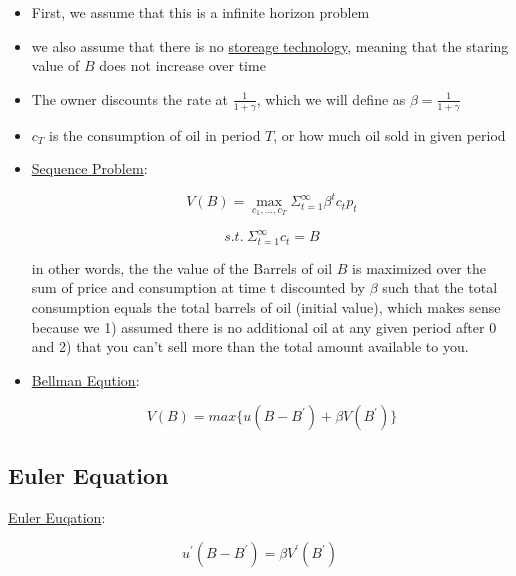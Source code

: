 \documentclass{article}
\begin{document}
\begin{itemize}

\item First, we assume that this is a infinite horizon problem

\item we also assume that there is no \underline{storeage technology}, meaning that the staring value of $B$ does not increase over time

\item The owner discounts the rate at $\frac{1}{1+\gamma}$, which we will define as $\beta  = \frac{1}{1+\gamma}$

\item $c_T$ is the consumption of oil in period $T$, or how much oil sold in given period

\item \underline{Sequence Problem}:

\[V(B) = \max_{c_1,...,c_T}\Sigma_{t=1}^\infty \beta^t c_t p_t \]

\[s.t. \ \Sigma_{t=1}^\infty c_t = B\]

in other words, the the value of the Barrels of oil $B$ is maximized over the sum of price and consumption at time t discounted by $\beta$ such that the total consumption equals the total barrels of oil (initial value), which makes sense because we 1) assumed there is no additional oil at any given period after 0 and 2) that you can't sell more than the total amount available to you.

\item \underline{Bellman Eqution}:

\[ V(B) = max\{ u(B-B^\prime) + \beta V(B^\prime) \} \]

\end{itemize}

\subsection{Euler Equation}

\underline{Euler Euqation}:

\[u^\prime(B-B^\prime) = \beta V^\prime(B^\prime) \]


\subsection{}
\end{document}
